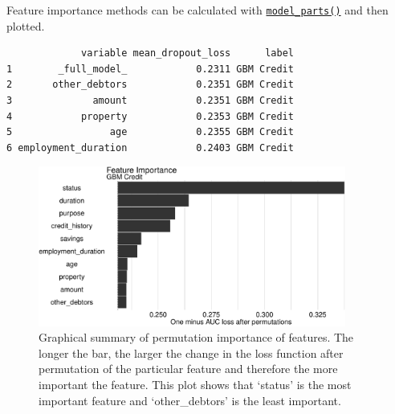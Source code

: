 Feature importance methods can be calculated with
\href{https://www.rdocumentation.org/packages/DALEX/topics/model_parts}{\texttt{model\_parts()}}
and then plotted.

\begin{Shaded}
\begin{Highlighting}[]
\OtherTok{=} 
\end{Highlighting}
\end{Shaded}

\begin{verbatim}
             variable mean_dropout_loss      label
1        _full_model_            0.2311 GBM Credit
2       other_debtors            0.2351 GBM Credit
3              amount            0.2351 GBM Credit
4            property            0.2353 GBM Credit
5                 age            0.2355 GBM Credit
6 employment_duration            0.2403 GBM Credit
\end{verbatim}

\begin{Shaded}
\begin{Highlighting}[]
 \NormalTok{)}
\end{Highlighting}
\end{Shaded}

\begin{figure}

{\centering \includegraphics[width=0.9\textwidth,height=\textheight]{chapters/chapter12/model_interpretation_files/figure-pdf/fig-dalex-featimp-1.pdf}

}

\caption{\label{fig-dalex-featimp}Graphical summary of permutation
importance of features. The longer the bar, the larger the change in the
loss function after permutation of the particular feature and therefore
the more important the feature. This plot shows that `status' is the
most important feature and `other\_debtors' is the least important.}

\end{figure}

